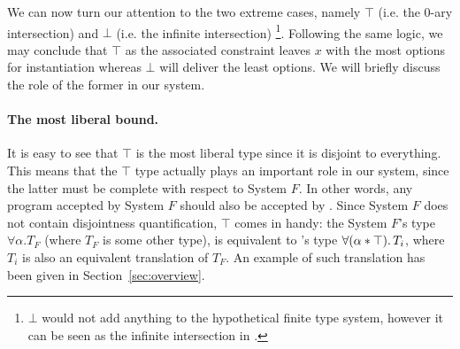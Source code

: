 We can now turn our attention to the two extreme cases, namely $\top$ 
(i.e. the 0-ary intersection) and $\bot$ (i.e. the infinite intersection) 
\footnote{$\bot$ would not add anything to the hypothetical finite type 
system, however it can be seen as the infinite intersection in \name.}.
Following the same logic, we may conclude that $\top$ as the associated constraint leaves $x$ with 
the most options for instantiation whereas $\bot$ will deliver the least options.
We will briefly discuss the role of the former in our system. 

\paragraph{The most liberal bound.}
It is easy to see that $\top$ is the most liberal type since it is disjoint to everything. 
This means that the $\top$ type actually plays an important role in our system, since the latter 
must be complete with respect to System $F$. 
In other words, any program accepted by System $F$ should also be accepted by \name.
Since System $F$ does not contain disjointness quantification, $\top$ comes in handy:
the System $F$'s type $\forall \alpha. {T_F}$ (where ${T_F}$ is some other type), is
equivalent to \name's type $\forall (\alpha * \top).\, T_i$, where ${T_i}$ is also an equivalent 
translation of $T_{F}$.
An example of such translation has been given in Section~\ref{sec:overview}.

